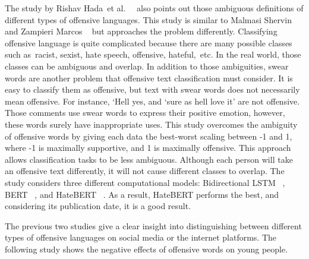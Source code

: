 \documentclass[11pt, natbib=false]{article}
\begin{document}
The study by Rishav Hada et al. ~\cite{hada2021ruddit} also points out those ambiguous definitions of different types of offensive languages.
This study is similar to Malmasi Shervin and Zampieri Marcos ~\cite{malmasi2017detecting} but approaches the problem differently.
Classifying offensive language is quite complicated because there are many possible classes such as racist, sexist, hate speech, offensive, hateful, etc. In the real world, those classes can be ambiguous and overlap.
In addition to those ambiguities, swear words are another problem that offensive text classification must consider.
It is easy to classify them as offensive, but text with swear words does not necessarily mean offensive.
For instance, ‘Hell yes, and ‘sure as hell love it’ are not offensive.
Those comments use swear words to express their positive emotion, however, these words surely have inappropriate uses.
This study overcomes the ambiguity of offensive words by giving each data the best-worst scaling between -1 and 1, where -1 is maximally supportive, and 1 is maximally offensive.
This approach allows classification tasks to be less ambiguous.
Although each person will take an offensive text differently, it will not cause different classes to overlap.
The study considers three different computational models: Bidirectional LSTM ~\cite{pennington2014glove}, BERT ~\cite{devlin2018bert}, and HateBERT ~\cite{caselli2020hatebert}.
As a result, HateBERT performs the best, and considering its publication date, it is a good result. 

The previous two studies give a clear insight into distinguishing between different types of offensive languages on social media or the internet platforms.
The following study shows the negative effects of offensive words on young people.
\end{document}
